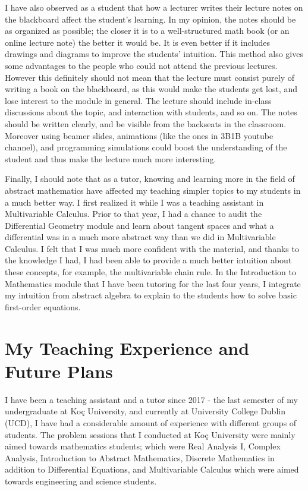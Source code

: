 \documentclass{article}
\begin{document}
\vspace{5mm}

\par I have also observed as a student that how a lecturer writes their lecture notes on the blackboard affect the student's learning. In my opinion, the notes should be as organized as possible; the closer it is to a well-structured math book (or an online lecture note) the better it would be. It is even better if it includes drawings and diagrams to improve the students' intuition. This method also gives some advantages to the people who could not attend the previous lectures. However this definitely should not mean that the lecture must consist purely of writing a book on the blackboard, as this would make the students get lost, and lose interest to the module in general. The lecture should include in-class discussions about the topic, and interaction with students, and so on. The notes should be written clearly, and be visible from the backseats in the classroom. Moreover using beamer slides, animations (like the ones in 3B1B youtube channel), and programming simulations could boost the understanding of the student and thus make the lecture much more interesting.

\vspace{5mm}

\par Finally, I should note that as a tutor, knowing and learning more in the field of abstract mathematics have affected my teaching simpler topics to my students in a much better way. I first realized it while I was a teaching assistant in Multivariable Calculus. Prior to that year, I had a chance to audit the Differential Geometry module and learn about tangent spaces and what a differential was in a much more abstract way than we did in Multivariable Calculus. I felt that I was much more confident with the material, and thanks to the knowledge I had, I had been able to provide a much better intuition about these concepts, for example, the multivariable chain rule. In the Introduction to Mathematics module that I have been tutoring for the last four years, I integrate my intuition from abstract algebra to explain to the students how to solve basic first-order equations.

\section*{My Teaching Experience and Future Plans}

\par I have been a teaching assistant and a tutor since 2017 - the last semester of my undergraduate at Koç University, and currently at University College Dublin (UCD), I have had a considerable amount of experience with different groups of students. The problem sessions that I conducted at Koç University were mainly aimed towards mathematics students; which were Real Analysis I, Complex Analysis, Introduction to Abstract Mathematics, Discrete Mathematics in addition to Differential Equations, and Multivariable Calculus which were aimed towards engineering and science students.
\end{document}
